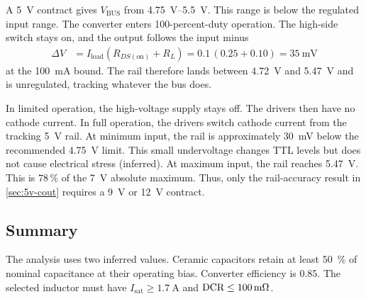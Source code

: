 A \SI{5}{\volt} contract gives $V_{\mathrm{BUS}}$ from
\SIrange{4.75}{5.5}{\volt}. This range is below the regulated input range. The
converter enters 100-percent-duty operation. The high-side switch stays on, and
the output follows the input minus
\begin{align*}
  \Delta V &= I_{\mathrm{load}}\left(R_{DS(\mathrm{on})}+R_L\right)
    = 0.1\,(0.25+0.10) = \SI{35}{\milli\volt}
\end{align*}
at the \SI{100}{\milli\ampere} bound. The rail therefore lands between
\SI{4.72}{\volt} and \SI{5.47}{\volt} and is unregulated, tracking whatever the
bus does.

In limited operation, the high-voltage supply stays off. The drivers then have
no cathode current. In full operation, the drivers switch cathode current from
the tracking 5~V rail. At minimum input, the rail is approximately
\SI{30}{\milli\volt} below the recommended \SI{4.75}{\volt} limit. This small
undervoltage changes TTL levels but does not cause electrical stress (inferred).
At maximum input, the rail reaches \SI{5.47}{\volt}. This is $78\,\%$ of the
\SI{7}{\volt} absolute maximum. Thus, only the rail-accuracy result in
\cref{sec:5v-cout} requires a \SI{9}{\volt} or \SI{12}{\volt} contract.

\subsection{Summary}\label{sec:5v-summary}

The analysis uses two inferred values. Ceramic capacitors retain at least
\SI{50}{\percent} of nominal capacitance at their operating bias. Converter
efficiency is 0.85. The selected inductor must have
$I_{\mathrm{sat}}\geq\SI{1.7}{\ampere}$ and
${\rm DCR}\leq\SI{100}{\milli\ohm}$.

